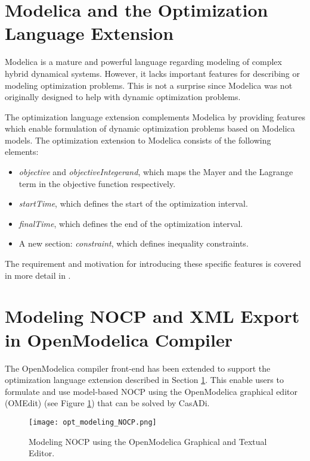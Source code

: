 \section{Modelica and the Optimization Language Extension}
\label{sec:optimizationoptimica}

Modelica is a mature and powerful language regarding modeling of complex hybrid dynamical systems. However, it
lacks important features for describing or modeling optimization problems. This is not a surprise since Modelica
was not originally designed to help with dynamic optimization problems.

The optimization language extension \cite{optimica} complements Modelica by providing features which enable
formulation of dynamic optimization problems based on Modelica models. The optimization extension to Modelica
consists of the following elements:

\begin{itemize}
	
\item \textit{objective} and \textit{objectiveIntegerand}, which maps the Mayer and the Lagrange term in 
             the objective function respectively.
\item \textit{startTime}, which defines the start of the optimization interval.
\item \textit{finalTime}, which defines the end of the optimization interval.
\item A new section: \textit{constraint}, which defines inequality constraints.
\end{itemize}

The requirement and motivation for introducing these specific features is covered in more detail in \cite{optimica}.

\section{Modeling NOCP and XML Export in OpenModelica Compiler}
\label{sec:optimizationopenmodelica}

The OpenModelica compiler front-end has been extended to support the optimization language extension described in
Section \ref{sec:optimizationoptimica}. This enable users to formulate and use model-based NOCP using the OpenModelica graphical editor (OMEdit) (see Figure \ref{fig:nocpmodel}) that can be solved by CasADi.

\begin{figure}
	\texttt{[image: opt\_modeling\_NOCP.png]}
	\caption{Modeling NOCP using the OpenModelica Graphical and Textual Editor.}
	\label{fig:nocpmodel}
\end{figure}

